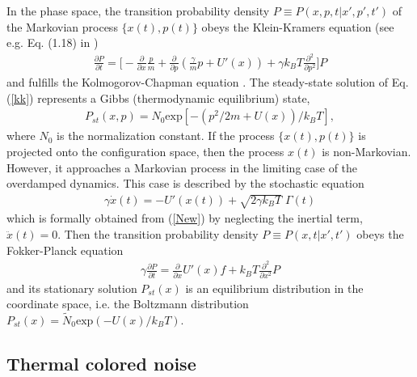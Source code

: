 \documentclass[authoryear,draft,1p,times]{elsarticle}
\renewcommand{\=}{\stackrel{\mathrm{d}}{=}}
\begin{document}
In the phase space,  the transition probability density 
$P\equiv P(x,p,t|x',p',t')$ of the Markovian process $\{x(t), p(t)\}$ obeys 
the Klein-Kramers equation
(see e.g. Eq. (1.18) in  \cite{risk})
%
\begin{eqnarray}  \label{kk}
\frac{\partial P}{\partial t} 
= \Bigg[
 -\frac{\partial}{\partial  x} \frac{p}{m} +
\frac{\partial}{\partial p} \left ( \frac{\gamma}{m} p
+ U'(x) \right )
+ \gamma k_B T
\frac{\partial^2}{\partial p^2}\Bigg] P
\end{eqnarray}
%
and fulfills the Kolmogorov-Chapman equation \cite{gar}. 
The steady-state solution of   Eq. (\ref{kk}) represents  
a Gibbs (thermodynamic equilibrium)  state, 
%
\begin{eqnarray}  \label{sst}
P_{st}(x,p) = N_0 \mbox{exp} \left[ -\left ( {p^2/2m}
+ U(x)\right )/k_B T \right ],
\end{eqnarray}
%
where $N_0$ is the normalization constant.  
If the process $\{x(t), p(t)\}$ is projected onto the configuration space, 
then the process $x(t)$ is non-Markovian. However, it 
 approaches a Markovian  process in the limiting case of the 
overdamped dynamics. This case is described by the stochastic equation
%
\begin{eqnarray}
\label{over}
\gamma \dot x(t)= - U'(x(t)) + \sqrt{2\gamma k_BT}\;\Gamma(t)
\end{eqnarray}
% 
which is formally obtained from (\ref{New}) by neglecting 
the inertial term,  $\ddot x(t) = 0$. 
Then the transition probability density $P \equiv P(x,t|x',t')$ 
obeys the Fokker-Planck equation
%
\begin{eqnarray}  \label{f-p}
\gamma \frac{\partial P}{\partial t} 
= \frac{\partial}{\partial  x}  U'(x) f  
+  k_B T
\frac{\partial^2}{\partial x^2}  P 
\end{eqnarray}
%
and its  stationary solution $P_{st}(x)$  is an equilibrium 
distribution in the coordinate space, i.e. the Boltzmann distribution 
$P_{st}(x) = \widetilde N_0 \mbox{exp}(-U(x)/k_BT)$. 


\subsection{Thermal colored noise} 
\end{document}
